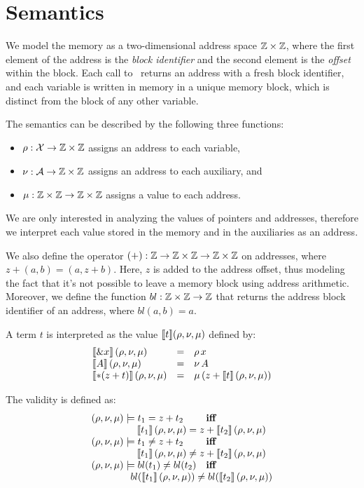 \section{Semantics}

We model the memory as a two-dimensional address space $\mathbb{Z} \times \mathbb{Z}$,
where the first element of the address is the \emph{block identifier} and the second element is the \emph{offset} within the block.
Each call to \malloc\ returns an address with a fresh block identifier, and each variable is written in memory in a unique memory block,
which is distinct from the block of any other variable.

The semantics can be described by the following three functions:
\begin{itemize}
\item $\rho : \mathcal{X} \rightarrow \mathbb{Z} \times \mathbb{Z}$ assigns an address to each variable,
\item $\nu : \mathcal{A} \rightarrow \mathbb{Z} \times \mathbb{Z}$ assigns an address to each auxiliary, and
\item $\mu : \mathbb{Z} \times \mathbb{Z} \rightarrow \mathbb{Z} \times \mathbb{Z}$ assigns a value to each address.
\end{itemize}
We are only interested in analyzing the values of pointers and addresses, therefore we interpret each value stored in the memory and in the auxiliaries as an address.

We also define the operator $(+) : \mathbb{Z} \rightarrow \mathbb{Z} \times \mathbb{Z} \rightarrow \mathbb{Z} \times \mathbb{Z}$ on addresses, where $z + (a,b) = (a, z+b)$.
Here, $z$ is added to the address offset, thus modeling the fact that it's not possible to leave a memory block using address arithmetic.
Moreover, we define the function $bl : \mathbb{Z} \times \mathbb{Z} \rightarrow \mathbb{Z}$ that returns the address block identifier of an address, where $bl(a,b) = a$.

A term $t$ is interpreted as the value $\llbracket t\rrbracket(\rho, \nu, \mu)$ defined by:
\[
  \begin{array}{lll}
    \llbracket\& x\rrbracket\,(\rho,\nu,\mu)   & = & \rho\,x                          \\
    \llbracket A\rrbracket\,(\rho,\nu,\mu)      & = & \nu\,A                           \\
    \llbracket*(z+t)\rrbracket\,(\rho,\nu,\mu) & = & \mu\,(z+\llbracket t\rrbracket\,(\rho,\nu,\mu)) \\
  \end{array}
\]

The validity is defined as:
\[
  \begin{array}{ll}
    (\rho,\nu,\mu)\models t_1 = z+t_2          & \textbf{iff}
    \\ \multicolumn{2}{c}{\quad\quad\quad\quad\sem{t_1}\,(\rho,\nu,\mu) = z+\sem{t_2}\,(\rho,\nu,\mu)}	\\
    (\rho,\nu,\mu)\models t_1 \neq z+t_2       & \textbf{iff}
    \\ \multicolumn{2}{c}{\quad\quad\quad\quad\sem{t_1}\,(\rho,\nu,\mu) \neq z+\sem{t_2}\,(\rho,\nu,\mu)}	\\
    (\rho,\nu,\mu)\models bl(t_1) \neq bl(t_2) & \textbf{iff}
    \\ \multicolumn{2}{c}{\quad\quad\quad\quad bl(\sem{t_1}\,(\rho, \nu, \mu)) \neq bl(\sem{t_2}\,(\rho, \nu, \mu))}
  \end{array}
\]


